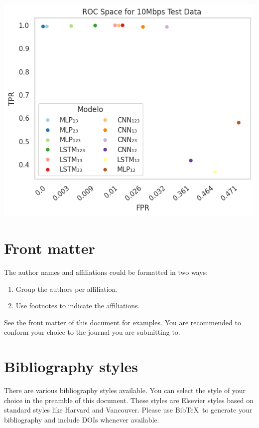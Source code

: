 \documentclass[a4paper,fleqn]{cas-sc}
\begin{document}
\begin{minipage}{0.1\textwidth}
	\centering
	\includegraphics[width=1.0\textwidth]{./figs/ROC-Space-Test-Data-10Mbps.png}
	\label{fig:ROCDesempenhoteste10Mbps}	
\end{minipage}
\hfill
\endgroup




\section{Front matter}

The author names and affiliations could be formatted in two ways:
\begin{enumerate}[(1)]
\item Group the authors per affiliation.
\item Use footnotes to indicate the affiliations.
\end{enumerate}
See the front matter of this document for examples. 
You are recommended to conform your choice to the journal you 
are submitting to.

\section{Bibliography styles}

There are various bibliography styles available. You can select the
style of your choice in the preamble of this document. These styles are
Elsevier styles based on standard styles like Harvard and Vancouver.
Please use Bib\TeX\ to generate your bibliography and include DOIs
whenever available.
\end{document}
